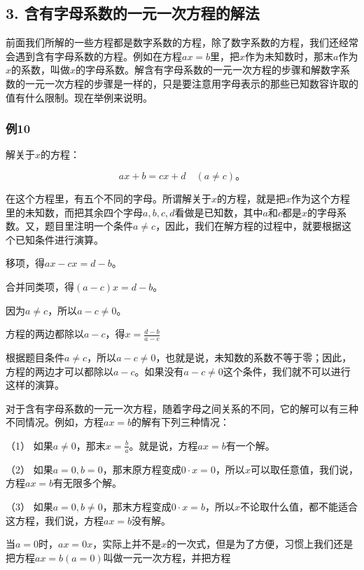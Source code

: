 \subsection{3. 含有字母系数的一元一次方程的解法}

前面我们所解的一些方程都是数字系数的方程，除了数字系数的方程，我们还经常会遇到含有字母系数的方程。例如在方程\(ax = b\)里，把\(x\)作为未知数时，那末\(a\)作为\(x\)的系数，叫做\(x\)的字母系数。解含有字母系数的一元一次方程的步骤和解数字系数的一元一次方程的步骤是一样的，只是要注意用字母表示的那些已知数容许取的值有什么限制。现在举例来说明。

\subsubsection{例10}

解关于\(x\)的方程：

\[
a x + b = c x + d \quad (a \neq c)\text{。}
\]

在这个方程里，有五个不同的字母。所谓解关于\(x\)的方程，就是把\(x\)作为这个方程里的未知数，而把其余四个字母\(a, b, c, d\)看做是已知数，其中\(a\)和\(c\)都是\(x\)的字母系数。又，题目里注明一个条件\(a \neq c\)，因此，我们在解方程的过程中，就要根据这个已知条件进行演算。

 移项，得\(ax - cx = d - b\)。

合并同类项，得\((a-c)x=d-b\)。

因为\(a \neq c\)，所以\(a - c \neq 0\)。

方程的两边都除以\(a - c\)，得\(x = \frac{d - b}{a - c}\)

根据题目条件\(a \neq c\)，所以\(a - c \neq 0\)，也就是说，未知数的系数不等于零；因此，方程的两边才可以都除以\(a - c\)。如果没有\(a - c \neq 0\)这个条件，我们就不可以进行这样的演算。

对于含有字母系数的一元一次方程，随着字母之间关系的不同，它的解可以有三种不同情况。例如，方程\(ax = b\)的解有下列三种情况：

（1）
如果\(a \neq 0\)，那末\(x = \frac{b}{a}\)。就是说，方程\(ax = b\)有一个解。

（2）
如果\(a = 0, b = 0\)，那末原方程变成\(0 \cdot x = 0\)，所以\(x\)可以取任意值，我们说，方程\(ax = b\)有无限多个解。

（3）
如果\(a = 0, b \neq 0\)，那末方程变成\(0 \cdot x = b\)，所以\(x\)不论取什么值，都不能适合这方程，我们说，方程\(ax = b\)没有解。

当\(a = 0\)时，\(ax = 0x\)，实际上并不是\(x\)的一次式，但是为了方便，习惯上我们还是把方程\(ax = b (a = 0)\)叫做一元一次方程，并把方程

